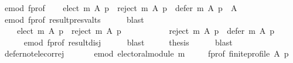 \begin{isabellebody}
\ e{\isacharunderscore}{\kern0pt}mod\ f{\isacharunderscore}{\kern0pt}prof\isanewline
\ \ \isamarkupfalse%
\ {\isachardoublequoteopen}{\isacharparenleft}{\kern0pt}elect\ m\ A\ p{\isacharparenright}{\kern0pt}\ {\isasymunion}\ {\isacharparenleft}{\kern0pt}reject\ m\ A\ p{\isacharparenright}{\kern0pt}\ {\isasymunion}\ {\isacharparenleft}{\kern0pt}defer\ m\ A\ p{\isacharparenright}{\kern0pt}\ {\isacharequal}{\kern0pt}\ A{\isachardoublequoteclose}\isanewline
\ \ \ \ \isamarkupfalse%
\ e{\isacharunderscore}{\kern0pt}mod\ f{\isacharunderscore}{\kern0pt}prof\ result{\isacharunderscore}{\kern0pt}presv{\isacharunderscore}{\kern0pt}alts\isanewline
\ \ \ \ \isamarkupfalse%
\ blast\isanewline
\ \ \isamarkupfalse%
\ \isamarkupfalse%
\ {}\ \isamarkupfalse%
\isanewline
\ \ \ \ {\isachardoublequoteopen}{\isacharparenleft}{\kern0pt}elect\ m\ A\ p{\isacharparenright}{\kern0pt}\ {\isasyminter}\ {\isacharparenleft}{\kern0pt}reject\ m\ A\ p{\isacharparenright}{\kern0pt}\ {\isacharequal}{\kern0pt}\ {\isacharbraceleft}{\kern0pt}{\isacharbraceright}{\kern0pt}\ {\isasymand}\isanewline
\ \ \ \ \ \ \ \ {\isacharparenleft}{\kern0pt}reject\ m\ A\ p{\isacharparenright}{\kern0pt}\ {\isasyminter}\ {\isacharparenleft}{\kern0pt}defer\ m\ A\ p{\isacharparenright}{\kern0pt}\ {\isacharequal}{\kern0pt}\ {\isacharbraceleft}{\kern0pt}{\isacharbraceright}{\kern0pt}{\isachardoublequoteclose}\isanewline
\ \ \ \ \isamarkupfalse%
\ e{\isacharunderscore}{\kern0pt}mod\ f{\isacharunderscore}{\kern0pt}prof\ result{\isacharunderscore}{\kern0pt}disj\isanewline
\ \ \ \ \isamarkupfalse%
\ blast\isanewline
\ \ \isamarkupfalse%
\ \isamarkupfalse%
\ {\isacharquery}{\kern0pt}thesis\isanewline
\ \ \ \ \isamarkupfalse%
\ blast\isanewline
{}\isamarkupfalse%
%
\endisatagproof
{\isafoldproof}%
%
\isadelimproof
\isanewline
%
\endisadelimproof
\isanewline
{}\isamarkupfalse%
\ defer{\isacharunderscore}{\kern0pt}not{\isacharunderscore}{\kern0pt}elec{\isacharunderscore}{\kern0pt}or{\isacharunderscore}{\kern0pt}rej{\isacharcolon}{\kern0pt}\isanewline
\ \ \isanewline
\ \ \ \ e{\isacharunderscore}{\kern0pt}mod{\isacharcolon}{\kern0pt}\ {\isachardoublequoteopen}electoral{\isacharunderscore}{\kern0pt}module\ m{\isachardoublequoteclose}\ \isanewline
\ \ \ \ f{\isacharunderscore}{\kern0pt}prof{\isacharcolon}{\kern0pt}\ {\isachardoublequoteopen}finite{\isacharunderscore}{\kern0pt}profile\ A\ p{\isachardoublequoteclose}\isanewline

\end{isabellebody}
